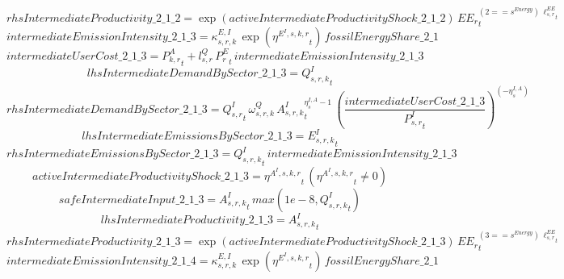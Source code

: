 \begin{dmath*}
rhsIntermediateProductivity\_2\_1\_2 = \exp\left({activeIntermediateProductivityShock\_2\_1\_2}\right)\, {{EE_r}}_{t}^{\left(2=={{s^{Energy}}}\right)\, {{\ell^{EE}_{s,r}}}_{t}}
\end{dmath*}
\begin{dmath*}
intermediateEmissionIntensity\_2\_1\_3 = {{\kappa^{E,I}_{s,r,k}}}\, \exp\left({{\eta^{E^{I},s,k,r}}}_{t}\right)\, {fossilEnergyShare\_2\_1}
\end{dmath*}
\begin{dmath*}
intermediateUserCost\_2\_1\_3 = {{P^{A}_{k,r}}}_{t}+{{l^{Q}_{s,r}}}\, {{P^E_r}}_{t}\, {intermediateEmissionIntensity\_2\_1\_3}
\end{dmath*}
\begin{dmath*}
lhsIntermediateDemandBySector\_2\_1\_3 = {{Q^{I}_{s,r,k}}}_{t}
\end{dmath*}
\begin{dmath*}
rhsIntermediateDemandBySector\_2\_1\_3 = {{Q^{I}_{s,r}}}_{t}\, {{\omega^{Q}_{s,r,k}}}\, {{A^{I}_{s,r,k}}}_{t}^{{{\eta^{I,A}_{s}}}-1}\, \left(\frac{{intermediateUserCost\_2\_1\_3}}{{{P^{I}_{s,r}}}_{t}}\right)^{\left(-{{\eta^{I,A}_{s}}}\right)}
\end{dmath*}
\begin{dmath*}
lhsIntermediateEmissionsBySector\_2\_1\_3 = {{E^I_{s,r,k}}}_{t}
\end{dmath*}
\begin{dmath*}
rhsIntermediateEmissionsBySector\_2\_1\_3 = {{Q^{I}_{s,r,k}}}_{t}\, {intermediateEmissionIntensity\_2\_1\_3}
\end{dmath*}
\begin{dmath*}
activeIntermediateProductivityShock\_2\_1\_3 = {{\eta^{A^{I},s,k,r}}}_{t}\, \left({{\eta^{A^{I},s,k,r}}}_{t}\neq 0\right)
\end{dmath*}
\begin{dmath*}
safeIntermediateInput\_2\_1\_3 = {{A^{I}_{s,r,k}}}_{t}\, max(1e-8,{{Q^{I}_{s,r,k}}}_{t})
\end{dmath*}
\begin{dmath*}
lhsIntermediateProductivity\_2\_1\_3 = {{A^{I}_{s,r,k}}}_{t}
\end{dmath*}
\begin{dmath*}
rhsIntermediateProductivity\_2\_1\_3 = \exp\left({activeIntermediateProductivityShock\_2\_1\_3}\right)\, {{EE_r}}_{t}^{\left(3=={{s^{Energy}}}\right)\, {{\ell^{EE}_{s,r}}}_{t}}
\end{dmath*}
\begin{dmath*}
intermediateEmissionIntensity\_2\_1\_4 = {{\kappa^{E,I}_{s,r,k}}}\, \exp\left({{\eta^{E^{I},s,k,r}}}_{t}\right)\, {fossilEnergyShare\_2\_1}
\end{dmath*}
